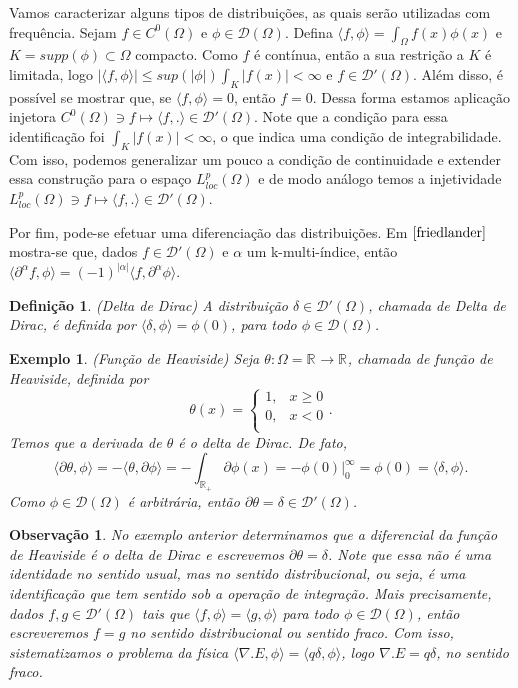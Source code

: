 \documentclass[12pt]{book}
\newtheorem{definicao}[teorema]{Definição}
\newtheorem{exemplo}[teorema]{Exemplo}
\newtheorem{observacao}[teorema]{Observação}
\newcommand{\distribuicoes}{\distribuicoesgeral{\Omega}}
\newcommand{\distribuicoesgeral}[1]{\mathcal{D'}(#1)}
\newcommand{\espacoLpcomp}[1]{L^{p}_{loc}(#1)}
\newcommand{\funcaocond}[5]{
	#1 = 
	\left\{
	\begin{array}{cc}
		#2, & #3\\
		#4, & #5\\
	\end{array}
	\right.
}
\newcommand{\funcoesdiferenciaveis}[2]{C^{#1}(#2)}
\newcommand{\funcoesteste}{\mathcal{D}(\Omega)}
\newcommand{\produtointerno}[2]{\langle #1, #2 \rangle}
\newcommand{\real}[1]{\mathbb{R}^{#1}}
\newcommand{\reta}{\real{}}
\begin{document}
	Vamos caracterizar alguns tipos de distribuições, as quais serão utilizadas com frequência. Sejam $f \in \funcoesdiferenciaveis{0}{\Omega}$ e $\phi \in \funcoesteste$. Defina $\produtointerno{f}{\phi}=\int_{\Omega}f(x)\phi(x)$ e $K = supp(\phi) \subset \Omega$ compacto. Como $f$ é contínua, então a sua restrição a $K$ é limitada, logo $|\produtointerno{f}{\phi}|\leq sup(|\phi|)\int_{K}|f(x)|<\infty$ e $f \in \distribuicoes$. Além disso, é possível se mostrar que, se $\produtointerno{f}{\phi}= 0$, então $f=0$. Dessa forma estamos aplicação injetora $\funcoesdiferenciaveis{0}{\Omega}\ni f \mapsto \produtointerno{f}{.} \in \distribuicoes$. Note que a condição para essa identificação foi $\int_{K}|f(x)|<\infty$, o que indica uma condição de integrabilidade. Com isso, podemos generalizar um pouco a condição de continuidade e extender essa construção para o espaço $\espacoLpcomp{\Omega}$ e de modo análogo temos a injetividade $\espacoLpcomp{\Omega} \ni f \mapsto \produtointerno{f}{.} \in \distribuicoes$.
	
	Por fim, pode-se efetuar uma diferenciação das distribuições. Em $\cite{friedlander}$ mostra-se que, dados $f \in \distribuicoes$ e $\alpha$ um k-multi-índice, então $\produtointerno{\partial^{\alpha}f}{\phi} = (-1)^{|\alpha|}\produtointerno{f}{\partial^{\alpha}\phi}$.
	
	\begin{definicao}
		(Delta de Dirac) A distribuição $\delta \in \distribuicoes$, chamada de Delta de Dirac, é definida por $\produtointerno{\delta}{\phi} = \phi(0)$, para todo $\phi \in \funcoesteste$.
	\end{definicao}
	
	\begin{exemplo}
		(Função de Heaviside) Seja $\theta:\Omega = \reta \to \reta$, chamada de função de Heaviside, definida por
		$$
		\funcaocond{\theta(x)}{1}{x\geq0}{0}{x<0}.
		$$
		Temos que a derivada de $\theta$ é o delta de Dirac. De fato,
		$$
		\produtointerno{\partial\theta}{\phi} = -		\produtointerno{\theta}{\partial\phi} = -\int_{\reta_{+}}\partial \phi(x) = -\phi(0)\Big|^{\infty}_{0} = \phi(0) = \produtointerno{\delta}{\phi}.
		$$
		Como $\phi \in \funcoesteste$ é arbitrária, então $\partial \theta = \delta \in \distribuicoes$.
	\end{exemplo}
	
	\begin{observacao}
		No exemplo anterior determinamos que a diferencial da função de Heaviside é o delta de Dirac e escrevemos $\partial \theta = \delta$. Note que essa não é uma identidade no sentido usual, mas no sentido distribucional, ou seja, é uma identificação que tem sentido sob a operação de integração. Mais precisamente, dados $f,g \in \distribuicoes$ tais que $\produtointerno{f}{\phi}=\produtointerno{g}{\phi}$ para todo $\phi \in \funcoesteste$, então escreveremos $f=g$ no sentido distribucional ou sentido fraco. Com isso, sistematizamos o problema da física $\produtointerno{\nabla.E}{\phi} = \produtointerno{q\delta}{\phi}$, logo $\nabla.E = q\delta$, no sentido fraco.
	\end{observacao}
	
\end{document}
